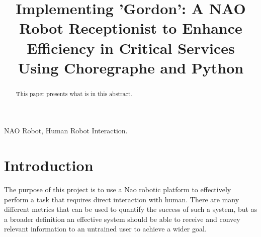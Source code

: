 \documentclass[conference]{IEEEtran}
\begin{document}
\title{Implementing 'Gordon': A NAO Robot Receptionist to Enhance Efficiency in Critical Services Using Choregraphe and Python}

\author{
}

\maketitle

\begin{abstract}

This paper presents what is in this abstract. 

\end{abstract}

\begin{IEEEkeywords}

NAO Robot, Human Robot Interaction.

\end{IEEEkeywords}

\section{Introduction}

The purpose of this project is to use a Nao robotic platform to effectively perform a task that requires direct interaction with human. 
There are many different metrics that can be used to quantify the success of such a system, but as a broader definition an effective system 
should be able to receive and convey relevant information to an untrained user to achieve a wider goal.
\end{document}
